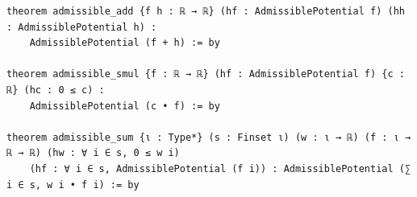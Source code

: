 \begin{Verbatim}[fontsize=\scriptsize,frame=single,framesep=1.5mm]
theorem admissible_add {f h : ℝ → ℝ} (hf : AdmissiblePotential f) (hh : AdmissiblePotential h) :
    AdmissiblePotential (f + h) := by

theorem admissible_smul {f : ℝ → ℝ} (hf : AdmissiblePotential f) {c : ℝ} (hc : 0 ≤ c) :
    AdmissiblePotential (c • f) := by

theorem admissible_sum {ι : Type*} (s : Finset ι) (w : ι → ℝ) (f : ι → ℝ → ℝ) (hw : ∀ i ∈ s, 0 ≤ w i)
    (hf : ∀ i ∈ s, AdmissiblePotential (f i)) : AdmissiblePotential (∑ i ∈ s, w i • f i) := by
\end{Verbatim}

